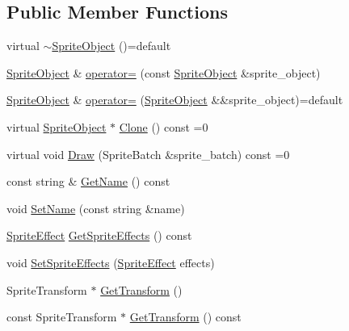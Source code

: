 \subsection*{Public Member Functions}
\begin{DoxyCompactItemize}
\item 
virtual \hyperlink{classmage_1_1_sprite_object_a88c02e6af2ab79389de368dd9ba32930}{$\sim$\+Sprite\+Object} ()=default
\item 
\hyperlink{classmage_1_1_sprite_object}{Sprite\+Object} \& \hyperlink{classmage_1_1_sprite_object_ac3ff1a1763e7fee3d6461cfd121bd5b2}{operator=} (const \hyperlink{classmage_1_1_sprite_object}{Sprite\+Object} \&sprite\+\_\+object)
\item 
\hyperlink{classmage_1_1_sprite_object}{Sprite\+Object} \& \hyperlink{classmage_1_1_sprite_object_ab51df65f44159c6d0015894003661452}{operator=} (\hyperlink{classmage_1_1_sprite_object}{Sprite\+Object} \&\&sprite\+\_\+object)=default
\item 
virtual \hyperlink{classmage_1_1_sprite_object}{Sprite\+Object} $\ast$ \hyperlink{classmage_1_1_sprite_object_a556c1ffcf4015ba4f8a803974b53ca88}{Clone} () const =0
\item 
virtual void \hyperlink{classmage_1_1_sprite_object_a1c1c885fe7846f7ee1cc0b73571c2fa0}{Draw} (Sprite\+Batch \&sprite\+\_\+batch) const =0
\item 
const string \& \hyperlink{classmage_1_1_sprite_object_aceda3826a222603d30e2d2b827f491bb}{Get\+Name} () const
\item 
void \hyperlink{classmage_1_1_sprite_object_a784cd7d61f3a9f71a521656ae3199366}{Set\+Name} (const string \&name)
\item 
\hyperlink{namespacemage_a9cfe18123066ba4236f548f9de75d881}{Sprite\+Effect} \hyperlink{classmage_1_1_sprite_object_af759fd1b68e2707b0f084da183e0b5f1}{Get\+Sprite\+Effects} () const
\item 
void \hyperlink{classmage_1_1_sprite_object_ad2eb556b5965d894e81cca96c5c0540b}{Set\+Sprite\+Effects} (\hyperlink{namespacemage_a9cfe18123066ba4236f548f9de75d881}{Sprite\+Effect} effects)
\item 
Sprite\+Transform $\ast$ \hyperlink{classmage_1_1_sprite_object_ab48dfd7c6833067d67634bc89d7cb99c}{Get\+Transform} ()
\item 
const Sprite\+Transform $\ast$ \hyperlink{classmage_1_1_sprite_object_a73733c89ee3c47d0e8b8bb81a06bc48c}{Get\+Transform} () const
\end{DoxyCompactItemize}
